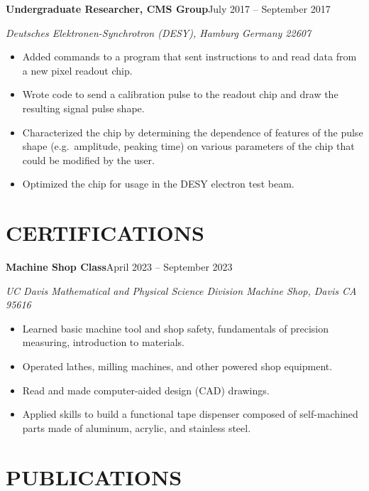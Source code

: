 \documentclass[11pt,letterpaper]{article}
\newcommand{\entry}[2]{%
  \needspace{3\baselineskip}%
  \noindent\textbf{#1}\hfill #2\par}
\newcommand{\affil}[1]{\noindent\textit{#1}\par\vspace{1pt}}
\begin{document}
\vspace{0.4\baselineskip}
\entry{Undergraduate Researcher, CMS Group}{July 2017 -- September 2017}
\affil{Deutsches Elektronen-Synchrotron (DESY), Hamburg Germany 22607}
\begin{itemize}
  \item Added commands to a program that sent instructions to and read data from a new
        pixel readout chip.
  \item Wrote code to send a calibration pulse to the readout chip and draw the
        resulting signal pulse shape.
  \item Characterized the chip by determining the dependence of features of the pulse
        shape (e.g.\ amplitude, peaking time) on various parameters of the chip that
        could be modified by the user.
  \item Optimized the chip for usage in the DESY electron test beam.
\end{itemize}

\section*{CERTIFICATIONS}

\entry{Machine Shop Class}{April 2023 -- September 2023}
\affil{UC Davis Mathematical and Physical Science Division Machine Shop, Davis CA 95616}
\begin{itemize}
  \item Learned basic machine tool and shop safety, fundamentals of precision measuring,
        introduction to materials.
  \item Operated lathes, milling machines, and other powered shop equipment.
  \item Read and made computer-aided design (CAD) drawings.
  \item Applied skills to build a functional tape dispenser composed of self-machined
        parts made of aluminum, acrylic, and stainless steel.
\end{itemize}

\section*{PUBLICATIONS}
\end{document}
